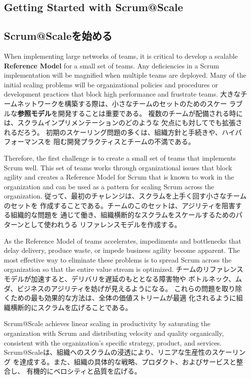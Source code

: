 \documentclass[12pt,a4paper,parskip=full]{scrartcl}
\begin{document}
\subsection{Getting Started with Scrum@Scale}
\fi
\subsection{Scrum@Scaleを始める}
When implementing large networks of teams, it is critical to develop a
scalable \textbf{Reference Model} for a small set of teams. Any
deficiencies in a Scrum implementation will be magnified when multiple
teams are deployed. Many of the initial scaling problems will be organizational 
policies and procedures or development practices that block high performance and frustrate 
teams. 
\fi
大きなチームネットワークを構築する際は、小さなチームのセットのためのスケー
ラブルな\textbf{参照モデル}を開発することは重要である。
複数のチームが配備される時には、スクラムインプリメンテーションのどのような
欠点にも対してでも拡張されるだろう。
初期のスケーリング問題の多くは、組織方針と手続きや、ハイパフォーマンスを
阻む開発プラクティスとチームの不満である。

Therefore, the first challenge is to create a small set of teams that
implements Scrum well. This set of teams works through organizational
issues that block agility and creates a Reference Model for Scrum that is
known to work in the organization and can be used as a pattern for scaling
Scrum across the organization.
\fi
従って、最初のチャレンジは、スクラムを上手く回す小さなチームのセットを
作成することである。チームのこのセットは、アジリティを阻害する組織的な問題を
通じて働き、組織横断的なスクラムをスケールするためのパターンとして使われうる
リファレンスモデルを作成する。

As the Reference Model of teams accelerates, impediments and bottlenecks
that delay delivery, produce waste, or impede business agility become
apparent. The most effective way to eliminate these problems is to spread
Scrum across the organization so that the entire value stream is optimized.
\fi
チームのリファレンスモデルが加速すると、デリバリを遅延のもととなる障害物や
ボトルネック、ムダ、ビジネスのアジリティを妨げが見えるようになる。
これらの問題を取り除くための最も効果的な方法は、全体の価値ストリームが最適
化されるように組織横断的にスクラムを広げることである。

Scrum@Scale achieves linear scaling in productivity by saturating the
organization with Scrum and distributing velocity and quality organically,
consistent with the organization's specific strategy, product, and services.
\fi
Scrum@Scaleは、組織へのスクラムの浸透により、リニアな生産性のスケーリング
を達成する。また、組織の具体的な戦略、プロダクト、およびサービスと整合し、
有機的にベロシティと品質を広げる。
\end{document}
